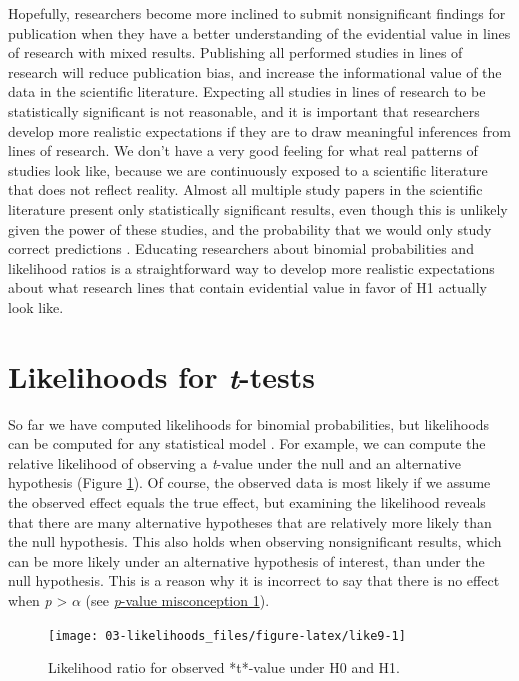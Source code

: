 \documentclass[
]{krantz}
\begin{document}
Hopefully, researchers become more inclined to submit nonsignificant findings for publication when they have a better understanding of the evidential value in lines of research with mixed results. Publishing all performed studies in lines of research will reduce publication bias, and increase the informational value of the data in the scientific literature. Expecting all studies in lines of research to be statistically significant is not reasonable, and it is important that researchers develop more realistic expectations if they are to draw meaningful inferences from lines of research. We don't have a very good feeling for what real patterns of studies look like, because we are continuously exposed to a scientific literature that does not reflect reality. Almost all multiple study papers in the scientific literature present only statistically significant results, even though this is unlikely given the power of these studies, and the probability that we would only study correct predictions \citep{scheel_excess_2021}. Educating researchers about binomial probabilities and likelihood ratios is a straightforward way to develop more realistic expectations about what research lines that contain evidential value in favor of H1 actually look like.

\hypertarget{likettest}{%
\section{\texorpdfstring{Likelihoods for \emph{t}-tests}{Likelihoods for t-tests}}\label{likettest}}

So far we have computed likelihoods for binomial probabilities, but likelihoods can be computed for any statistical model \citep{glover_likelihood_2004, pawitan_all_2001}. For example, we can compute the relative likelihood of observing a \emph{t}-value under the null and an alternative hypothesis (Figure \ref{fig:like9}). Of course, the observed data is most likely if we assume the observed effect equals the true effect, but examining the likelihood reveals that there are many alternative hypotheses that are relatively more likely than the null hypothesis. This also holds when observing nonsignificant results, which can be more likely under an alternative hypothesis of interest, than under the null hypothesis. This is a reason why it is incorrect to say that there is no effect when \emph{p} \textgreater{} \(\alpha\) (see \protect\hyperlink{misconception1}{\emph{p}-value misconception 1}).

\begin{figure}

{\centering \texttt{[image: 03-likelihoods\_files/figure-latex/like9-1]} 

}

\caption{Likelihood ratio for observed *t*-value under H0 and H1.}\label{fig:like9}
\end{figure}
\end{document}

